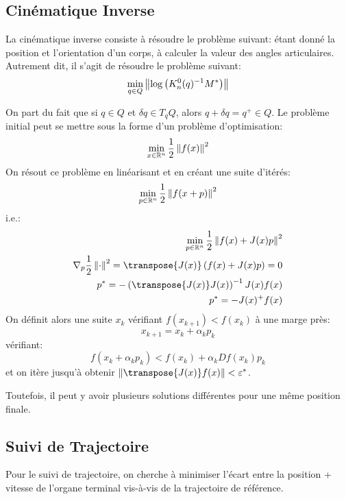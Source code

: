 \documentclass[math]{cours}
\begin{document}
\subsection{Cinématique Inverse}
\begin{definition}
	La cinématique inverse consiste à résoudre le problème suivant: étant donné la position et l'orientation d'un corps, à calculer la valeur des angles articulaires.
	Autrement dit, il s'agit de résoudre le problème suivant:
	\begin{equation*}
		\min_{q\in Q} \left\lVert \log \left(K_{n}^{0}(q)^{-1}M^{*}\right)\right\rVert
	\end{equation*}
	\label{def:cinematiqueinverse}
\end{definition}
On part du fait que si $q\in Q$ et $\delta q \in T_{q} Q$, alors $q + \delta q = q^{+} \in Q$.
Le problème initial peut se mettre sous la forme d'un problème d'optimisation:
\begin{equation*}
	\min_{x \in \mathbb{R}^{n}}\frac{1}{2}\left\lVert f(x)\right\rVert^{2}
\end{equation*}
On résout ce problème en linéarisant et en créant une suite d'itérés:
\begin{equation*}
	\min_{p\in \mathbb{R}^{n}} \frac{1}{2}\left\lVert f(x + p)\right\rVert^{2}
\end{equation*}
i.e.:
\begin{align*}
	\min_{p\in \R^{n}}\frac{1}{2}\norm{f(x) + J(x)p}^{2}                                   \\
	\nabla_{p}\frac{1}{2}\norm{\cdot}^{2} = \transpose{J(x)}\left(f(x) + J(x)p \right) = 0 \\
	p^{*} = -\left(\transpose{J(x)}J(x) \right)^{-1}J(x)f(x)                               \\
	p^{*} = -J(x)^{+}f(x)
\end{align*}
On définit alors une suite $x_{k}$ vérifiant $f(x_{k + 1}) < f(x_{k})$ à une marge près:
\begin{equation*}
	x_{k + 1} = x_{k} + \alpha_{k}p_{k}
\end{equation*}
vérifiant:
\begin{equation*}
	f(x_{k} + \alpha_{k}p_{k}) < f(x_{k}) + \alpha_{k} Df(x_{k})p_{k}
\end{equation*}
et on itère jusqu'à obtenir $\norm{\transpose{J(x)}f(x)} < \epsilon^{*}$.

Toutefois, il peut y avoir plusieurs solutions différentes pour une même position finale.

\subsection{Suivi de Trajectoire}
Pour le suivi de trajectoire, on cherche à minimiser l'écart entre la position + vitesse de l'organe terminal vis-à-vis de la trajectoire de référence.
\end{document}
